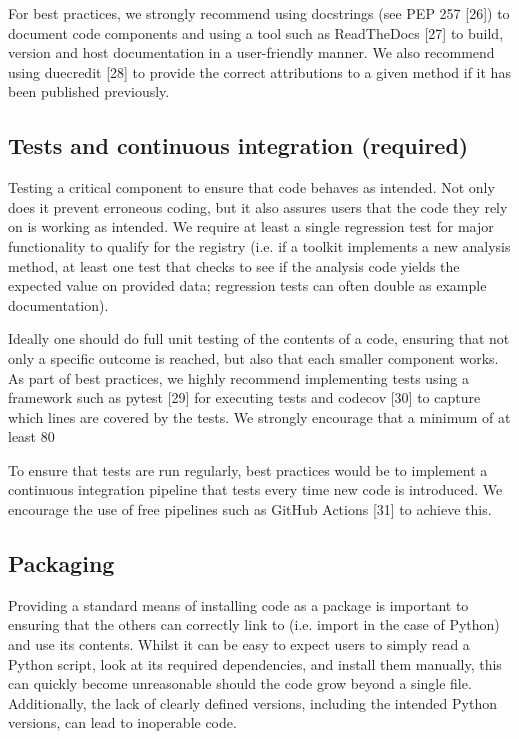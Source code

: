 \documentclass{article}
\begin{document}
For best practices, we strongly recommend using docstrings (see PEP 257 [26]) to document code components and using a tool such as ReadTheDocs [27] to build, version and host documentation in a user-friendly manner. We also recommend using duecredit [28] to provide the correct attributions to a given method if it has been published previously.

\subsection{Tests and continuous integration (required)}

Testing a critical component to ensure that code behaves as intended. Not only does it prevent erroneous coding, but it also assures users that the code they rely on is working as intended. We require at least a single regression test for major functionality to qualify for the registry (i.e. if a toolkit implements a new analysis method, at least one test that checks to see if the analysis code yields the expected value on provided data;  regression tests can often double as example documentation).

Ideally one should do full unit testing of the contents of a code, ensuring that not only a specific outcome is reached, but also that each smaller component works. As part of best practices, we highly recommend implementing tests using a framework such as pytest [29] for executing tests and codecov [30] to capture which lines are covered by the tests. We strongly encourage that a minimum of at least 80%

To ensure that tests are run regularly, best practices would be to implement a continuous integration pipeline that tests every time new code is introduced. We encourage the use of free pipelines such as GitHub Actions [31] to achieve this.

\subsection{Packaging}

Providing a standard means of installing code as a package is important to ensuring that the others can correctly link to (i.e. import in the case of Python) and use its contents. Whilst it can be easy to expect users to simply read a Python script, look at its required dependencies, and install them manually, this can quickly become unreasonable should the code grow beyond a single file. Additionally, the lack of clearly defined versions, including the intended Python versions, can lead to inoperable code.
\end{document}

